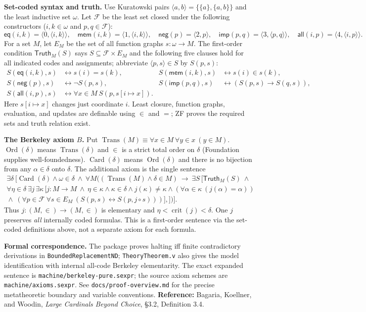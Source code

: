 \documentclass[10pt,letterpaper]{article}
\newcommand{\Trans}{\operatorname{Trans}}
\newcommand{\Ord}{\operatorname{Ord}}
\newcommand{\Card}{\operatorname{Card}}
\newcommand{\Eq}{\mathsf{eq}}
\newcommand{\Mem}{\mathsf{mem}}
\newcommand{\Neg}{\mathsf{neg}}
\newcommand{\Imp}{\mathsf{imp}}
\newcommand{\All}{\mathsf{all}}
\newcommand{\FormulaSet}{\mathcal F}
\newcommand{\Sat}{\mathsf{Truth}}
\begin{document}
\textbf{Set-coded syntax and truth.}
Use Kuratowski pairs $\langle a,b\rangle=\{\{a\},\{a,b\}\}$ and the least inductive
set $\omega$. Let $\FormulaSet$ be the least set closed under the following constructors
($i,k\in\omega$ and $p,q\in\FormulaSet$):
\[
\Eq(i,k)=\langle0,\langle i,k\rangle\rangle,\quad
\Mem(i,k)=\langle1,\langle i,k\rangle\rangle,\quad
\Neg(p)=\langle2,p\rangle,\quad
\Imp(p,q)=\langle3,\langle p,q\rangle\rangle,\quad
\All(i,p)=\langle4,\langle i,p\rangle\rangle.
\]
For a set $M$, let $E_M$ be the set of all function graphs $s:\omega\to M$.
The first-order condition $\Sat_M(S)$ says $S\subseteq\FormulaSet\times E_M$ and the
following five clauses hold for all indicated codes and assignments; abbreviate
$\langle p,s\rangle\in S$ by $S(p,s)$:
\begin{align*}
S(\Eq(i,k),s)&\leftrightarrow s(i)=s(k), &
S(\Mem(i,k),s)&\leftrightarrow s(i)\in s(k),\\
S(\Neg(p),s)&\leftrightarrow\neg S(p,s), &
S(\Imp(p,q),s)&\leftrightarrow(S(p,s)\to S(q,s)),\\
S(\All(i,p),s)&\leftrightarrow\forall x\in M\ S(p,s[i\mapsto x]). &&
\end{align*}
Here $s[i\mapsto x]$ changes just coordinate $i$.
Least closure, function graphs, evaluation, and updates are definable using
$\in$ and $=$; ZF proves the required sets and truth relation exist.

\textbf{The Berkeley axiom $B$.}
Put $\Trans(M)\equiv\forall x\in M\ \forall y\in x\ (y\in M)$.
$\Ord(\delta)$ means $\Trans(\delta)$ and $\in$ is a strict total order on $\delta$
(Foundation supplies well-foundedness).
$\Card(\delta)$ means $\Ord(\delta)$ and there is no bijection from any
$\alpha\in\delta$ onto $\delta$.
The additional axiom is the single sentence
\[
\boxed{\begin{aligned}
\exists\delta\ \bigl[\Card(\delta)\land\omega\in\delta\ \land\
\forall M\bigl((\Trans(M)\land\delta\in M)\ \to\ \exists S\,[\Sat_M(S)\ \land\qquad\qquad\\[-2pt]
\forall\eta\in\delta\ \exists j\,\exists\kappa\,[j:M\to M\ \land\
\eta\in\kappa\land\kappa\in\delta\land j(\kappa)\ne\kappa\land
(\forall\alpha\in\kappa\ (j(\alpha)=\alpha))\qquad\\[-2pt]
{}\land\ (\forall p\in\FormulaSet\ \forall s\in E_M\
 (S(p,s)\leftrightarrow S(p,j\circ s)))],]\bigr)\bigr].
\end{aligned}}
\]
Thus $j:(M,\in)\to(M,\in)$ is elementary and $\eta<\operatorname{crit}(j)<\delta$.
One $j$ preserves \emph{all} internally coded formulas. This is a first-order
sentence via the set-coded definitions above, not a separate axiom for each formula.

\vfill
{\footnotesize
\textbf{Formal correspondence.}
The package proves halting iff finite contradictory derivations in
\texttt{BoundedReplacementND}; \texttt{TheoryTheorem.v} also gives the model
identification with internal all-code Berkeley elementarity. The exact expanded
sentence is \texttt{machine/berkeley-pure.sexpr}; the source axiom schemes are
\texttt{machine/axioms.sexpr}. See \texttt{docs/proof-overview.md} for the precise
metatheoretic boundary and variable conventions.
\textbf{Reference:} Bagaria, Koellner, and Woodin, \emph{Large Cardinals Beyond Choice},
\S3.2, Definition 3.4.}
\end{document}
